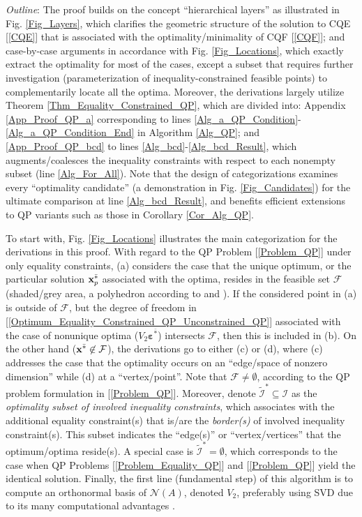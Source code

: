 \documentclass[9pt,twocolumn,twoside,lineno]{pnas-new-1}
\newcommand{\bfx}{{\bf x}}
\newcommand{\bfvarepsilon}{{\boldsymbol \varepsilon}}
\newcommand{\calF}{{\mathcal F}}
\newcommand{\calI}{{\mathcal I}}
\newcommand{\calN}{{\mathcal N}}
\theoremstyle{remark}
\begin{document}
\textit{Outline}: The proof builds on the concept ``hierarchical layers'' as illustrated in Fig. \ref{Fig_Layers}, which clarifies the geometric structure of the solution to CQE [\ref{CQE}] that is associated with the optimality/minimality of CQF [\ref{CQF}]; and case-by-case arguments in accordance with Fig. \ref{Fig_Locations}, which exactly extract the optimality for most of the cases, except a subset that requires further investigation (parameterization of inequality-constrained feasible points) to complementarily locate all the optima. Moreover, the derivations largely utilize Theorem \ref{Thm_Equality_Constrained_QP}, which are divided into: Appendix \ref{App_Proof_QP_a} corresponding to lines \ref{Alg_a_QP_Condition}-\ref{Alg_a_QP_Condition_End} in Algorithm \ref{Alg_QP}; and \ref{App_Proof_QP_bcd} to lines \ref{Alg_bcd}-\ref{Alg_bcd_Result}, which augments/coalesces the inequality constraints with respect to each nonempty subset (line \ref{Alg_For_All}). Note that the design of categorizations examines every ``optimality candidate'' (a demonstration in Fig. \ref{Fig_Candidates}) for the ultimate comparison at line \ref{Alg_bcd_Result}, and benefits efficient extensions to QP variants such as those in Corollary \ref{Cor_Alg_QP}.

To start with, Fig. \ref{Fig_Locations} illustrates the main categorization for the derivations in this proof. With regard to the QP Problem [\ref{Problem_QP}] under only equality constraints, (a) considers the case that the unique optimum, or the particular solution $\bfx_p^{\bar *}$ associated with the optima, resides in the feasible set $\calF$ (shaded/grey area, a polyhedron according to \cite{Lu(Ye):03(16)} and \cite{BoVa:04}). If the considered point in (a) is outside of $\calF$, but the degree of freedom in [\ref{Optimum_Equality_Constrained_QP_Unconstrained_QP}] associated with the case of nonunique optima ($V_2\bfvarepsilon^{\bar *}$) intersects $\calF$, then this is included in (b). On the other hand ($\bfx^{\bar *}\not\in\calF$), the derivations go to either (c) or (d), where (c) addresses the case that the optimality occurs on an ``edge/space of nonzero dimension'' while (d) at a ``vertex/point''. Note that $\calF\ne\emptyset$, according to the QP problem formulation in [\ref{Problem_QP}]. Moreover, denote $\tilde\calI^*\subseteq\calI$ as the \textit{optimality subset of involved inequality constraints}, which associates with the additional equality constraint(s) that is/are the \textit{border(s)} of involved inequality constraint(s). This subset indicates the ``edge(s)'' or ``vertex/vertices'' that the optimum/optima reside(s). A special case is $\tilde\calI^*=\emptyset$, which corresponds to the case when QP Problems [\ref{Problem_Equality_QP}] and [\ref{Problem_QP}] yield the identical solution. Finally, the first line (fundamental step) of this algorithm is to compute an orthonormal basis of $\calN(A)$, denoted $V_2$, preferably using SVD due to its many computational advantages \citep{GoVa:13}.
\end{document}
